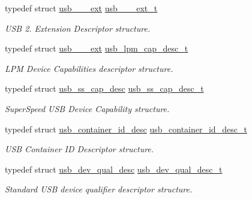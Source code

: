 \begin{DoxyCompactItemize}
typedef struct \hyperlink{structusb__2__0__ext}{usb\+\_\+\_\+\_\+ext} \hyperlink{group__usb__protocol__group_ga6763c8c797bc5e754f8da2341b163c64}{usb\+\_\+\_\+\_\+ext\+\_\+t}
\begin{DoxyCompactList}\small\item\em U\+SB 2. Extension Descriptor structure. \end{DoxyCompactList}\item 
\mbox{\label{group__usb__protocol__group_ga3263b200bda3311fde64ca3d85bc6a51}} 
typedef struct \hyperlink{structusb__2__0__ext}{usb\+\_\+\_\+\_\+ext} \hyperlink{group__usb__protocol__group_ga3263b200bda3311fde64ca3d85bc6a51}{usb\+\_\+lpm\+\_\+cap\+\_\+desc\+\_\+t}
\begin{DoxyCompactList}\small\item\em L\+PM Device Capabilities descriptor structure. \end{DoxyCompactList}\item 
\mbox{\label{group__usb__protocol__group_gae6778be79667a7deb1e468422f05d087}} 
typedef struct \hyperlink{structusb__ss__cap__desc}{usb\+\_\+ss\+\_\+cap\+\_\+desc} \hyperlink{group__usb__protocol__group_gae6778be79667a7deb1e468422f05d087}{usb\+\_\+ss\+\_\+cap\+\_\+desc\+\_\+t}
\begin{DoxyCompactList}\small\item\em Super\+Speed U\+SB Device Capability structure. \end{DoxyCompactList}\item 
\mbox{\label{group__usb__protocol__group_gab1692304fe3a2e344eb8dfc8f715aa15}} 
typedef struct \hyperlink{structusb__container__id__desc}{usb\+\_\+container\+\_\+id\+\_\+desc} \hyperlink{group__usb__protocol__group_gab1692304fe3a2e344eb8dfc8f715aa15}{usb\+\_\+container\+\_\+id\+\_\+desc\+\_\+t}
\begin{DoxyCompactList}\small\item\em U\+SB Container ID Descriptor structure. \end{DoxyCompactList}\item 
typedef struct \hyperlink{structusb__dev__qual__desc}{usb\+\_\+dev\+\_\+qual\+\_\+desc} \hyperlink{group__usb__protocol__group_ga5ba2cb1ea0d156db1e8f2a2ae58efade}{usb\+\_\+dev\+\_\+qual\+\_\+desc\+\_\+t}
\begin{DoxyCompactList}\small\item\em Standard U\+SB device qualifier descriptor structure. \end{DoxyCompactList}\item 

\end{DoxyCompactItemize}
